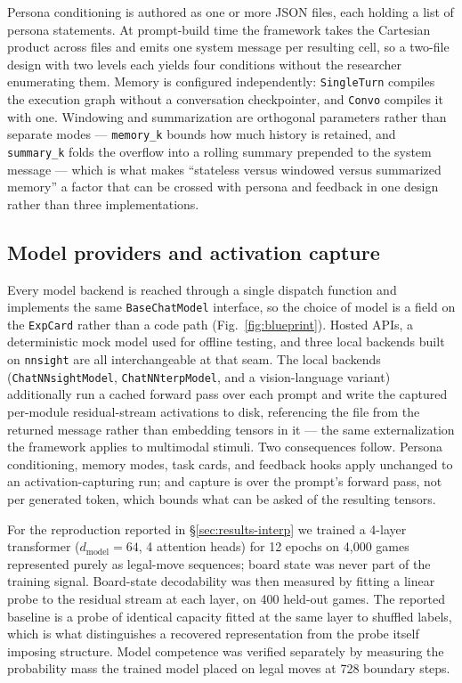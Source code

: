 \documentclass[pdflatex,sn-nature]{sn-jnl}
\begin{document}
Persona conditioning is authored as one or more JSON files, each holding a
list of persona statements. At prompt-build time the framework takes the
Cartesian product across files and emits one system message per resulting
cell, so a two-file design with two levels each yields four conditions
without the researcher enumerating them. Memory is configured
independently: \texttt{SingleTurn} compiles the execution graph without a
conversation checkpointer, and \texttt{Convo} compiles it with one.
Windowing and summarization are orthogonal parameters rather than separate
modes --- \texttt{memory\_k} bounds how much history is retained, and
\texttt{summary\_k} folds the overflow into a rolling summary prepended to
the system message --- which is what makes ``stateless versus windowed
versus summarized memory'' a factor that can be crossed with persona and
feedback in one design rather than three implementations.

\subsection{Model providers and activation
capture}\label{sec:methods-interp}

Every model backend is reached through a single dispatch function and
implements the same \texttt{BaseChatModel} interface, so the choice of
model is a field on the \texttt{ExpCard} rather than a code path
(Fig.~\ref{fig:blueprint}). Hosted APIs, a deterministic mock model used for
offline testing, and three local backends built on \texttt{nnsight} are all
interchangeable at that seam. The local backends
(\texttt{ChatNNsightModel}, \texttt{ChatNNterpModel}, and a
vision-language variant) additionally run a cached forward pass over each
prompt and write the captured per-module residual-stream activations to
disk, referencing the file from the returned message rather than embedding
tensors in it --- the same externalization the framework applies to
multimodal stimuli. Two consequences follow. Persona conditioning, memory
modes, task cards, and feedback hooks apply unchanged to an
activation-capturing run; and capture is over the prompt's forward pass, not
per generated token, which bounds what can be asked of the resulting
tensors.

For the reproduction reported in \S\ref{sec:results-interp} we trained a
4-layer transformer ($d_{\text{model}}=64$, 4 attention heads) for 12 epochs
on 4,000 games represented purely as legal-move sequences; board state was
never part of the training signal. Board-state decodability was then
measured by fitting a linear probe to the residual stream at each layer, on
400 held-out games. The reported baseline is a probe of identical capacity
fitted at the same layer to shuffled labels, which is what distinguishes a
recovered representation from the probe itself imposing structure. Model
competence was verified separately by measuring the probability mass the
trained model placed on legal moves at 728 boundary steps.
\end{document}
